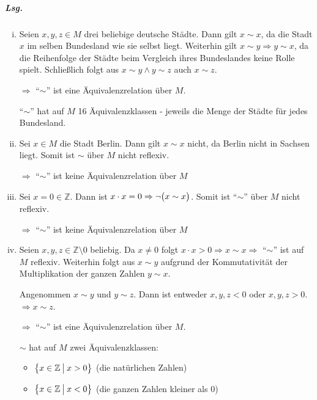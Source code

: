 \documentclass{scrreprt}
\begin{document}
\subparagraph{Lsg.}
\begin{enumerate}[(i)]
\item Seien $x, y, z \in M$ drei beliebige deutsche Städte.
  Dann gilt $x \sim x$, da die Stadt $x$ im selben Bundesland wie sie selbst
  liegt.
  Weiterhin gilt $x \sim y \Rightarrow y \sim x$, da die Reihenfolge der
  Städte beim Vergleich ihres Bundeslandes keine Rolle spielt.
  Schließlich folgt aus $x \sim y \land y \sim z$ auch $x \sim z$.

  $\Rightarrow$ ``$\sim$'' ist eine Äquivalenzrelation über $M$.

  ``$\sim$'' hat auf $M$ 16 Äquivalenzklassen - jeweils die Menge der Städte für
  jedes Bundesland.

\item Sei $x \in M$ die Stadt Berlin.
  Dann gilt $x \sim x$ nicht, da Berlin nicht in Sachsen liegt.
  Somit ist $\sim$ über $M$ nicht reflexiv.

  $\Rightarrow$ ``$\sim$'' ist keine Äquivalenzrelation über $M$

\item Sei $x = 0 \in \mathbb{Z}$.
  Dann ist $x \cdot x = 0 \Rightarrow \neg \qty\big(x \sim x)$.
  Somit ist ``$\sim$'' über $M$ nicht reflexiv.

  $\Rightarrow$ ``$\sim$'' ist keine Äquivalenzrelation über $M$

\item Seien $x, y, z \in \mathbb{Z} \setminus \qty{0}$ beliebig.
  Da $x \ne 0$ folgt $x \cdot x > 0 \Rightarrow x \sim x \Rightarrow$
  ``$\sim$'' ist auf $M$ reflexiv.
  Weiterhin folgt aus $x \sim y$ aufgrund der Kommutativität der Multiplikation
  der ganzen Zahlen $y \sim x$.

  Angenommen $x \sim y$ und $y \sim z$.
  Dann ist entweder $x, y, z < 0$ oder $x, y, z > 0$.
  $\Rightarrow x \sim z$.

  $\Rightarrow$ ``$\sim$'' ist eine Äquivalenzrelation über $M$.

  $\sim$ hat auf $M$ zwei Äquivalenzklassen:
  \begin{itemize}
  \item $\qty\big{x \in \mathbb{Z} \: {\big |} \: x > 0}$ (die natürlichen
    Zahlen)

  \item $\qty\big{x \in \mathbb{Z} \: {\big |} \: x < 0}$ (die ganzen Zahlen
    kleiner als $0$)
  \end{itemize}
\end{enumerate}
\end{document}
